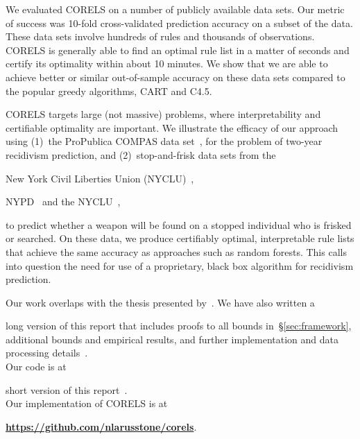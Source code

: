 \begin{arxiv}
We evaluated CORELS on a number of publicly available data sets.
%
Our metric of success was 10-fold cross-validated prediction accuracy on a subset of the data.
%
These data sets involve hundreds of rules and thousands of observations.
%
CORELS is generally able to find an optimal rule list in a matter of seconds
and certify its optimality within about 10 minutes.
%
We show that we are able to achieve better or similar out-of-sample accuracy on these
data sets compared to the popular greedy algorithms, CART and C4.5.
\end{arxiv}

CORELS targets large (not massive) problems,
where interpretability and certifiable optimality are important.
%
We illustrate the efficacy of our approach using (1)~the ProPublica COMPAS data set~\citep{LarsonMaKiAn16}, for the problem of two-year recidivism prediction,
and (2)~stop-and-frisk data sets from the
\begin{kdd}
New York Civil Liberties Union (NYCLU)~\citep{nyclu:2014},
\end{kdd}
\begin{arxiv}
NYPD~\citep{nypd} and the NYCLU~\citep{nyclu:2014},
\end{arxiv}
to predict whether a weapon will be found
on a stopped individual who is frisked or searched.
%
On these data, we produce certifiably optimal, interpretable rule lists that achieve
the same accuracy as approaches such as random forests.
%
This calls into question the need for use of a proprietary,
black box algorithm for recidivism prediction.

Our work overlaps with the thesis presented by~\citet{Larus-Stone17}.
%
We have also written a
\begin{kdd}
long version of this report that includes proofs to all
bounds in~\S\ref{sec:framework}, additional bounds and empirical results,
and further implementation and data processing details~\citep{AngelinoLaAlSeRu17}. \\

Our code is at
\end{kdd}
\begin{arxiv}
short version of this report~\citep{AngelinoLaAlSeRu17-kdd}. \\

Our implementation of CORELS is at
\end{arxiv}
\textbf{\url{https://github.com/nlarusstone/corels}}.
